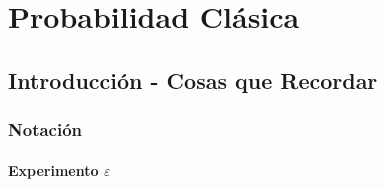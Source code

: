 \documentclass[12pt, fleqn]{report}                             %
\theoremstyle{break}                                            %
\begin{document}
\restoregeometry                                                    %
\nopagecolor                                                        %




\tableofcontents{}
\label{sec:Index}

\clearpage




\part{Probabilidad Clásica}
\clearpage


    \chapter{Introducción - Cosas que Recordar}



        \clearpage
        \section{Notación}


            \subsection{Experimento $\varepsilon$}
\end{document}
